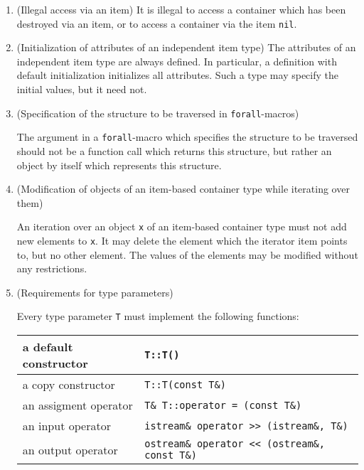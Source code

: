 \begin{enumerate}
      \item 
	

 (Illegal access via an item) It is illegal to access a
	container which has been destroyed via an item, or to access
	a container via the item \verb$nil$.
      


      \item 

	

 (Initialization of attributes of an independent item
	type) The attributes of an independent item type are always
	defined. In particular, a definition with default
	initialization initializes all attributes. Such a type may
	specify the initial values, but it need not.
      




      \item 



          

 (Specification of the structure to be traversed in \verb$forall$-macros) 

The argument in a \verb$forall$-macro which specifies the
structure to be traversed should not be a function call which
returns this structure, but rather an object by itself which
represents this structure.
      


      \item 


	

 (Modification of objects of an item-based container type
	while iterating over them)


An iteration over an object \verb$x$ of an item-based
container type must not add new elements to \verb$x$.  It
may delete the element which the iterator item points to, but no other
element. The values of the elements may be modified without any
restrictions.

      



      \item 
	

 (Requirements for type parameters) 

Every type parameter \verb$T$ must implement the following functions:

\begin{tabular}[h]{|ll|}
   \hline
   
	    
	      
		a default constructor & \verb$T::T()$\\
   \hline
		a copy constructor & \verb$T::T(const T&)$\\
   \hline
		an assigment operator & \verb$T& T::operator = (const T&)$\\
   \hline
		an input operator & \verb$istream& operator >> (istream&, T&)$\\
   \hline
		an output operator & \verb$ostream& operator << (ostream&, const T&)$\\
   \hline
	      

\end{tabular}
\end{enumerate}
